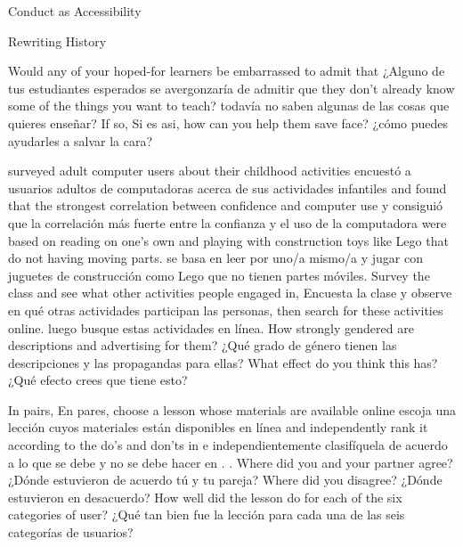 \begin{aside}{Conduct as Accessibility}
\begin{aside}{Rewriting History}

Would any of your hoped-for learners be embarrassed to admit that
¿Alguno de tus estudiantes esperados se avergonzaría de admitir que
they don't already know some of the things you want to teach?
todavía no saben algunas de las cosas que quieres enseñar?
If so,
Si es asi,
how can you help them save face?
¿cómo puedes ayudarles a salvar la cara?


\cite{Cutt2017} surveyed adult computer users about their childhood activities
\cite{Cutt2017} encuestó a usuarios adultos de computadoras acerca de sus actividades infantiles
and found that the strongest correlation between confidence and computer use
y consiguió que la correlación más fuerte entre la confianza y el uso de la computadora
were based on reading on one's own and playing with construction toys like Lego that do not having moving parts.
se basa en leer por uno/a mismo/a y jugar con juguetes de construcción como Lego que no tienen partes móviles.
Survey the class and see what other activities people engaged in,
Encuesta la clase y observe en qué otras actividades participan las personas,
then search for these activities online.
luego busque estas actividades en línea.
How strongly gendered are descriptions and advertising for them?
¿Qué grado de género tienen las descripciones y las propagandas para ellas?
What effect do you think this has?
¿Qué efecto crees que tiene esto?


In pairs,
En pares,
choose a lesson whose materials are available online
escoja una lección cuyos materiales están disponibles en línea
and independently rank it according to the do's and don'ts in
e independientemente clasifíquela de acuerdo a lo que se debe y no se debe hacer en
.
.
Where did you and your partner agree?
¿Dónde estuvieron de acuerdo tú y tu pareja?
Where did you disagree?
¿Dónde estuvieron en desacuerdo?
How well did the lesson do for each of the six categories of user?
¿Qué tan bien fue la lección para cada una de las seis categorías de usuarios?


\end{aside}
\end{aside}

